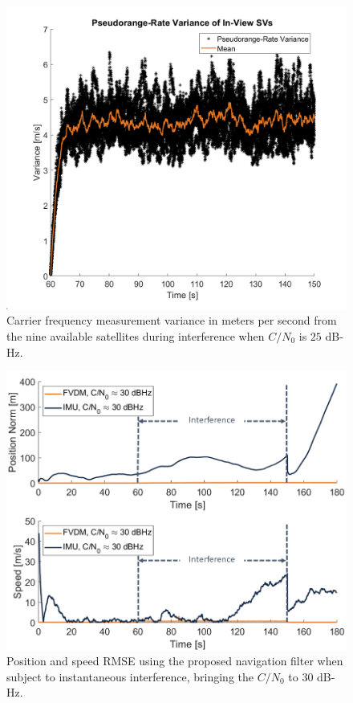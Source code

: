 \documentclass[12pt]{report}
\begin{document}
\begin{figure}[!ht]
  \centering
  \includegraphics[width=0.75\linewidth]{Figures/Results/Scenario1/Case25/carrierVariance.png}
  \caption{Carrier frequency measurement variance in meters per second from the nine available satellites during interference when \(C/N_0\) is \(25\) dB-Hz.}\label{fig:carrierVariance25}
\end{figure}

\begin{figure}[!ht]
  \centering
  \includegraphics[width=0.75\linewidth]{Figures/Results/trajectoryfigure/Slide17.PNG}
  \caption{Position and speed RMSE using the proposed navigation filter when subject to instantaneous interference, bringing the \(C/N_0\) to \(30\) dB-Hz.}\label{fig:PosVel30}
\end{figure}
\end{document}

